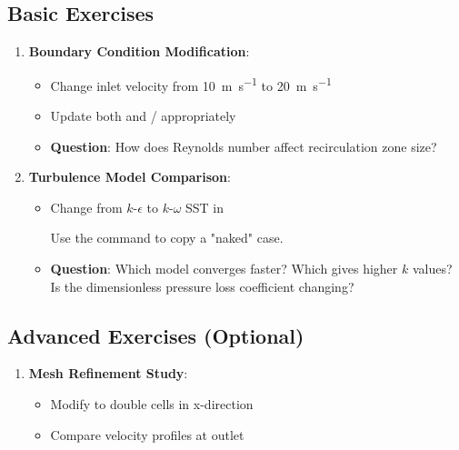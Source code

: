 \documentclass[
    parskip=half,      %
    DIV=12,            %
    headings=normal,   %
    fontsize=11pt,     %
    english            %
]{scrartcl}
\begin{document}
\subsection{Basic Exercises}
\begin{enumerate}

\item \textbf{Boundary Condition Modification}:
\begin{itemize}
\item Change inlet velocity from \SI{10}{\meter\per\second} to \SI{20}{\meter\per\second}
\item Update both  and / appropriately
\item \textbf{Question}: How does Reynolds number affect recirculation zone size?
\end{itemize}

\item \textbf{Turbulence Model Comparison}:
\begin{itemize}
\item Change from $k$-$\epsilon$ to $k$-$\omega$ SST in 

Use the command  to copy a "naked" case. 


\item \textbf{Question}: Which model converges faster? Which gives higher $k$ values? Is the dimensionless pressure loss coefficient changing?
\end{itemize}
\end{enumerate}

\subsection{Advanced Exercises (Optional)}
\begin{enumerate}
\item \textbf{Mesh Refinement Study}:
\begin{itemize}
\item Modify  to double cells in x-direction
\item Compare velocity profiles at outlet
\end{itemize}
\end{enumerate}
\end{document}
